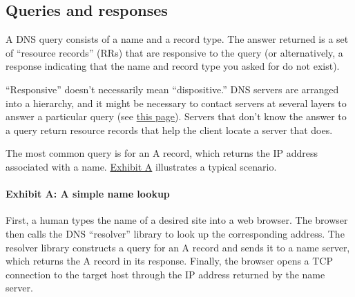 \hypertarget{part0024_split_002.htmlux5cux23_idContainer1069}{}
\hypertarget{part0024_split_002.htmlux5cux23calibre_pb_1}{%
\subsection[Queries and
responses]{\texorpdfstring{\protect\hypertarget{part0024_split_002.htmlux5cux23_idTextAnchor842}{}{}Queries
and
responses}{Queries and responses}}\label{part0024_split_002.htmlux5cux23calibre_pb_1}}

\protect\hypertarget{part0024_split_002.htmlux5cux23_idIndexMarker1969}{}{}\protect\hypertarget{part0024_split_002.htmlux5cux23_idIndexMarker1970}{}{}A
DNS query consists of a name and a record type. The answer returned is a
set of
\protect\hypertarget{part0024_split_002.htmlux5cux23_idIndexMarker1971}{}{}``resource
records'' (RRs) that are responsive to the query (or alternatively, a
response indicating that the name and record type you asked for do not
exist).

``Responsive'' doesn't necessarily mean ``dispositive.'' DNS servers are
arranged into a hierarchy, and it might be necessary to contact servers
at several layers to answer a particular query (see
\protect\hyperlink{part0024_split_015.htmlux5cux23_idTextAnchor859}{this
page}). Servers that don't know the answer to a query return resource
records that help the client locate a server that does.

The most common query is for an A record, which returns the IP address
associated with a name.
\protect\hyperlink{part0024_split_002.htmlux5cux23_idTextAnchor843}{Exhibit
A} illustrates a typical scenario.

\paragraph[{Exhibit A: }A simple name lookup]{\texorpdfstring{{Exhibit
A:
}\protect\hypertarget{part0024_split_002.htmlux5cux23_idTextAnchor843}{}{}A
simple name lookup}{Exhibit A: A simple name lookup}}


First, a human types the name of a desired site into a web browser. The
browser then calls the DNS ``resolver'' library to look up the
corresponding address. The resolver library constructs a query for an A
record and sends it to a name server, which returns the A record in its
response. Finally, the browser opens a TCP connection to the target host
through the IP address returned by the name server.

